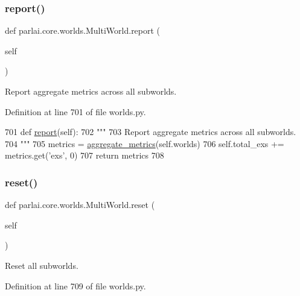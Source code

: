 \subsubsection{\texorpdfstring{report()}{report()}}
{\footnotesize\ttfamily def parlai.\+core.\+worlds.\+Multi\+World.\+report (\begin{DoxyParamCaption}\item[{}]{self }\end{DoxyParamCaption})}

\begin{DoxyVerb}Report aggregate metrics across all subworlds.
\end{DoxyVerb}
 

Definition at line 701 of file worlds.\+py.


\begin{DoxyCode}
701     \textcolor{keyword}{def }\hyperlink{namespaceprojects_1_1convai2_1_1eval__f1_a01a47b9c08dad189837a51f085defc45}{report}(self):
702         \textcolor{stringliteral}{"""}
703 \textcolor{stringliteral}{        Report aggregate metrics across all subworlds.}
704 \textcolor{stringliteral}{        """}
705         metrics = \hyperlink{namespaceparlai_1_1core_1_1metrics_aa4ed5491962e06684b235fffe1b20fec}{aggregate\_metrics}(self.worlds)
706         self.total\_exs += metrics.get(\textcolor{stringliteral}{'exs'}, 0)
707         \textcolor{keywordflow}{return} metrics
708 
\end{DoxyCode}
\mbox{\label{classparlai_1_1core_1_1worlds_1_1MultiWorld_afcdadb92455ce41a8156390d876ebb96}} 
\subsubsection{\texorpdfstring{reset()}{reset()}}
{\footnotesize\ttfamily def parlai.\+core.\+worlds.\+Multi\+World.\+reset (\begin{DoxyParamCaption}\item[{}]{self }\end{DoxyParamCaption})}

\begin{DoxyVerb}Reset all subworlds.
\end{DoxyVerb}
 

Definition at line 709 of file worlds.\+py.


